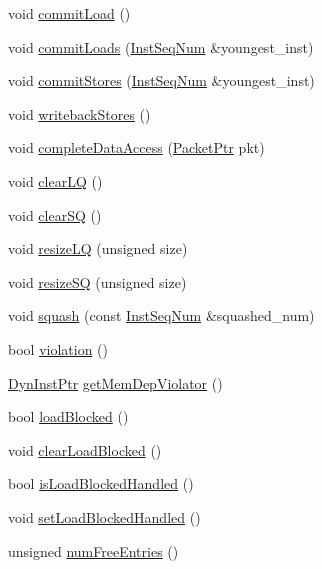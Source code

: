 \begin{DoxyCompactItemize}
\item 
void \hyperlink{classOzoneLWLSQ_a8ddd26e169a62ec5ae591a9f95934839}{commitLoad} ()
\item 
void \hyperlink{classOzoneLWLSQ_a1ae517a923a864a4e3a5aa1eeb2dd2d6}{commitLoads} (\hyperlink{inst__seq_8hh_a258d93d98edaedee089435c19ea2ea2e}{InstSeqNum} \&youngest\_\-inst)
\item 
void \hyperlink{classOzoneLWLSQ_a954ce1ce58b67cae49ba127d5ea40701}{commitStores} (\hyperlink{inst__seq_8hh_a258d93d98edaedee089435c19ea2ea2e}{InstSeqNum} \&youngest\_\-inst)
\item 
void \hyperlink{classOzoneLWLSQ_a5f04e29d6f6feb8b86460491f2ba7547}{writebackStores} ()
\item 
void \hyperlink{classOzoneLWLSQ_a0f7f0d3412bbf494cd3d0c0f48e5fcf2}{completeDataAccess} (\hyperlink{classPacket}{PacketPtr} pkt)
\item 
void \hyperlink{classOzoneLWLSQ_ae3af532345dbe6519e8272d9cd677230}{clearLQ} ()
\item 
void \hyperlink{classOzoneLWLSQ_a171cd7891063f418b1ee217f5c03537b}{clearSQ} ()
\item 
void \hyperlink{classOzoneLWLSQ_a3bc9500810cb2d5615e29206e2d6499f}{resizeLQ} (unsigned size)
\item 
void \hyperlink{classOzoneLWLSQ_a341dd6a3bd8d240659fd9d698c3b5c65}{resizeSQ} (unsigned size)
\item 
void \hyperlink{classOzoneLWLSQ_a51dd7e304d5413447717826fac6f4921}{squash} (const \hyperlink{inst__seq_8hh_a258d93d98edaedee089435c19ea2ea2e}{InstSeqNum} \&squashed\_\-num)
\item 
bool \hyperlink{classOzoneLWLSQ_a4f720bbfb5fdefdb23516500eeb0b4de}{violation} ()
\item 
\hyperlink{classOzoneLWLSQ_a028ce10889c5f6450239d9e9a7347976}{DynInstPtr} \hyperlink{classOzoneLWLSQ_a30adaf6f5fb6b38b5747f35c419e3f31}{getMemDepViolator} ()
\item 
bool \hyperlink{classOzoneLWLSQ_a05c413ba417c6453e99f75d87c958590}{loadBlocked} ()
\item 
void \hyperlink{classOzoneLWLSQ_aaa9628e569d007b553e6830774b8548c}{clearLoadBlocked} ()
\item 
bool \hyperlink{classOzoneLWLSQ_ad0aa91a7b51ca925abf9c9992abad314}{isLoadBlockedHandled} ()
\item 
void \hyperlink{classOzoneLWLSQ_ac8bfb1e163f7ba2261d702623226973d}{setLoadBlockedHandled} ()
\item 
unsigned \hyperlink{classOzoneLWLSQ_a028971a565aca048c67ea1c36a6a9d51}{numFreeEntries} ()

\end{DoxyCompactItemize}
